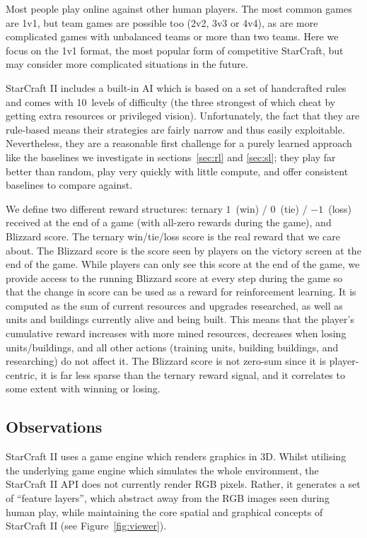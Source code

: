 Most people play online against other human players. The most common games are 1v1, but team games are possible too (2v2, 3v3 or 4v4), as are more complicated games with unbalanced teams or more than two teams. Here we focus on the 1v1 format, the most popular form of competitive StarCraft, but may consider more complicated situations in the future.

StarCraft II includes a built-in AI which is based on a set of handcrafted rules and comes with 10~levels of difficulty (the three strongest of which cheat by getting extra resources or privileged vision). Unfortunately, the fact that they are rule-based means their strategies are fairly narrow and thus easily exploitable. Nevertheless, they are a reasonable first challenge for a purely learned approach like the baselines we investigate in sections~\ref{sec:rl} and \ref{sec:sl}; they play far better than random, play very quickly with little compute, and offer consistent baselines to compare against. 

We define two different reward structures: ternary $1$~(win) / $0$~(tie) / $-1$~(loss) received at the end of a game (with all-zero rewards during the game), and Blizzard score. The ternary win/tie/loss score is the real reward that we care about. The Blizzard score is the score seen by players on the victory screen at the end of the game. While players can only see this score at the end of the game, we provide access to the running Blizzard score at every step during the game so that the change in score can be used as a reward for reinforcement learning. It is computed as the sum of current resources and upgrades researched, as well as units and buildings currently alive and being built. This means that the player's cumulative reward increases with more mined resources, decreases when losing units/buildings, and all other actions (training units, building buildings, and researching) do not affect it. The Blizzard score is not zero-sum since it is player-centric, it is far less sparse than the ternary reward signal, and it correlates to some extent with winning or losing.

\subsection{Observations}

StarCraft II uses a game engine which renders graphics in 3D. Whilst utilising the underlying game engine which simulates the whole environment, the StarCraft II API does not currently render RGB pixels. Rather, it generates a set of ``feature layers'', which abstract away from the RGB images seen during human play, while maintaining the core spatial and graphical concepts of StarCraft II (see Figure~\ref{fig:viewer}). 

